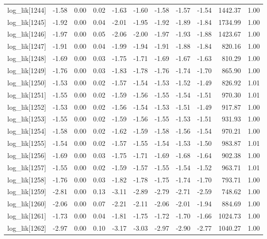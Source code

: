 \begin{table}[ht]
\begin{tabular}{rrrrrrrrrrr}
  log\_lik[1244] & -1.58 & 0.00 & 0.02 & -1.63 & -1.60 & -1.58 & -1.57 & -1.54 & 1442.37 & 1.00 \\ 
  log\_lik[1245] & -1.92 & 0.00 & 0.04 & -2.01 & -1.95 & -1.92 & -1.89 & -1.84 & 1734.99 & 1.00 \\ 
  log\_lik[1246] & -1.97 & 0.00 & 0.05 & -2.06 & -2.00 & -1.97 & -1.93 & -1.88 & 1423.67 & 1.00 \\ 
  log\_lik[1247] & -1.91 & 0.00 & 0.04 & -1.99 & -1.94 & -1.91 & -1.88 & -1.84 & 820.16 & 1.00 \\ 
  log\_lik[1248] & -1.69 & 0.00 & 0.03 & -1.75 & -1.71 & -1.69 & -1.67 & -1.63 & 810.29 & 1.00 \\ 
  log\_lik[1249] & -1.76 & 0.00 & 0.03 & -1.83 & -1.78 & -1.76 & -1.74 & -1.70 & 865.90 & 1.00 \\ 
  log\_lik[1250] & -1.53 & 0.00 & 0.02 & -1.57 & -1.54 & -1.53 & -1.52 & -1.49 & 826.92 & 1.01 \\ 
  log\_lik[1251] & -1.55 & 0.00 & 0.02 & -1.59 & -1.56 & -1.55 & -1.54 & -1.51 & 970.30 & 1.01 \\ 
  log\_lik[1252] & -1.53 & 0.00 & 0.02 & -1.56 & -1.54 & -1.53 & -1.51 & -1.49 & 917.87 & 1.00 \\ 
  log\_lik[1253] & -1.55 & 0.00 & 0.02 & -1.59 & -1.56 & -1.55 & -1.53 & -1.51 & 931.93 & 1.00 \\ 
  log\_lik[1254] & -1.58 & 0.00 & 0.02 & -1.62 & -1.59 & -1.58 & -1.56 & -1.54 & 970.21 & 1.00 \\ 
  log\_lik[1255] & -1.54 & 0.00 & 0.02 & -1.57 & -1.55 & -1.54 & -1.53 & -1.50 & 983.87 & 1.01 \\ 
  log\_lik[1256] & -1.69 & 0.00 & 0.03 & -1.75 & -1.71 & -1.69 & -1.68 & -1.64 & 902.38 & 1.00 \\ 
  log\_lik[1257] & -1.55 & 0.00 & 0.02 & -1.59 & -1.57 & -1.55 & -1.54 & -1.52 & 963.71 & 1.01 \\ 
  log\_lik[1258] & -1.76 & 0.00 & 0.03 & -1.82 & -1.78 & -1.75 & -1.74 & -1.70 & 793.71 & 1.00 \\ 
  log\_lik[1259] & -2.81 & 0.00 & 0.13 & -3.11 & -2.89 & -2.79 & -2.71 & -2.59 & 748.62 & 1.00 \\ 
  log\_lik[1260] & -2.06 & 0.00 & 0.07 & -2.21 & -2.11 & -2.06 & -2.01 & -1.94 & 884.69 & 1.00 \\ 
  log\_lik[1261] & -1.73 & 0.00 & 0.04 & -1.81 & -1.75 & -1.72 & -1.70 & -1.66 & 1024.73 & 1.00 \\ 
  log\_lik[1262] & -2.97 & 0.00 & 0.10 & -3.17 & -3.03 & -2.97 & -2.90 & -2.77 & 1040.27 & 1.00 \\ 

\end{tabular}
\end{table}
